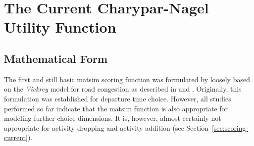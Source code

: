 \section{The Current Charypar-Nagel Utility Function}
\label{sec:charyparnagel}
\subsection{Mathematical Form}
\label{sec:mathematical-form}

The first and still basic \gls{matsim} scoring function was formulated by \citet[][]{CharyparNagel2005ga4acts} loosely based on the \emph{Vickrey} model for road congestion as described in \citet[][]{Vickrey_TAER_1969} and \citet[][]{ArnottEtAl_TAER_1993}. Originally, this formulation was established for departure time choice. However, all studies performed so far indicate that the \gls{matsim} function is also appropriate for modeling 
further choice dimensions.
%
It is, however, almost certainly not appropriate for activity dropping and activity addition (see Section~\ref{sec:scoring-current}).




